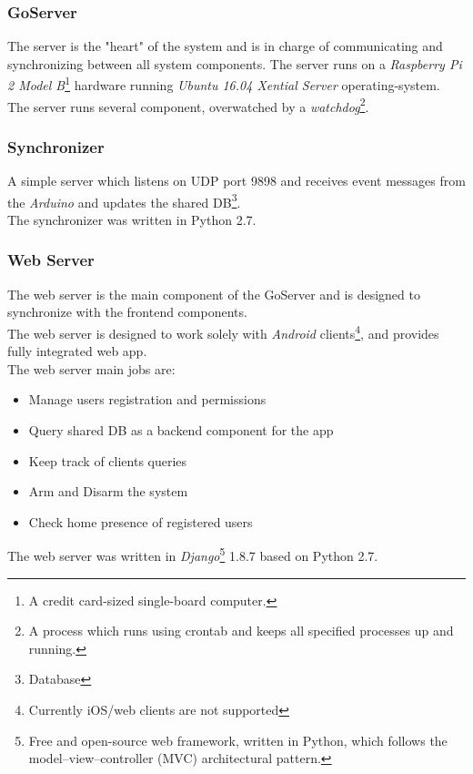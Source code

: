\documentclass[10pt]{article}
\begin{document}
\subsubsection{GoServer}
The server is the "heart" of the system and is in charge of communicating and synchronizing between all system components.
The server runs on a \emph{Raspberry Pi 2 Model B}\footnote{A credit card-sized single-board computer.} hardware running \emph{Ubuntu 16.04 Xential Server} operating-system. \\
The server runs several component, overwatched by a \emph{watchdog}\footnote{A process which runs using crontab and keeps all specified processes up and running.}. \\
\quad \subsubsection*{Synchronizer}
\quad A simple server which listens on UDP port 9898 and receives event messages from the \emph{Arduino} and updates the shared DB\footnote{Database}. \\
\quad The synchronizer was written in Python 2.7. \\
\quad \subsubsection*{Web Server}
\quad The web server is the main component of the GoServer and is designed to synchronize with the frontend components. \\
\quad The web server is designed to work solely with \emph{Android} clients\footnote{Currently iOS/web clients are not supported}, and provides fully integrated web app. \\
\quad The web server main jobs are:
\begin{itemize}
	\item Manage users registration and permissions
	\item Query shared DB as a backend component for the app
	\item Keep track of clients queries
	\item Arm and Disarm the system
	\item Check home presence of registered users
\end{itemize}
\quad The web server was written in \emph{Django}\footnote{Free and open-source web framework, written in Python, which follows the model–view–controller (MVC) architectural pattern.} 1.8.7 based on Python 2.7.
\end{document}
